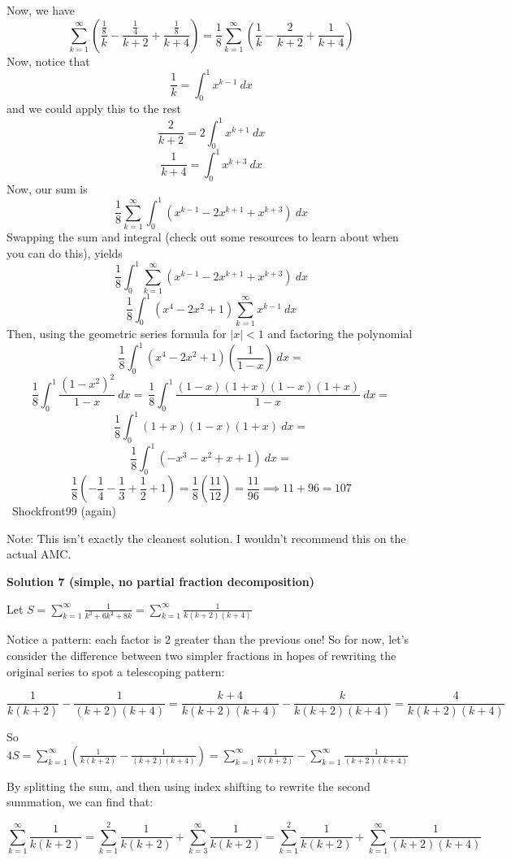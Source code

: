 \begin{enumerate}
 Now, we have 
 \[\sum_{k=1}^{\infty} \left(\frac{\frac{1}{8}}{k}-\frac{\frac{1}{4}}{k+2}+\frac{\frac{1}{8}}{k+4}\right)=\frac{1}{8}\sum_{k=1}^{\infty} \left(\frac{1}{k}-\frac{2}{k+2}+\frac{1}{k+4}\right)\]Now, notice that 
 \[\frac{1}{k}=\int_0^1x^{k-1} \ dx\]and we could apply this to the rest
 \[\frac{2}{k+2}=2\int_0^1x^{k+1} \ dx\]
 \[\frac{1}{k+4}=\int_0^1x^{k+3} \ dx\]Now, our sum is
 \[\frac{1}{8}\sum_{k=1}^\infty\int_0^1\left(x^{k-1}-2x^{k+1}+x^{k+3}\right) \ dx\]Swapping the sum and integral (check out some resources to learn about when you can do this), yields
 \[\frac{1}{8}\int_0^1\sum_{k=1}^\infty\left(x^{k-1}-2x^{k+1}+x^{k+3}\right) \ dx\]
 \[\frac{1}{8}\int_0^1 \left(x^{4}-2x^2+1\right)\sum_{k=1}^\infty x^{k-1} \ dx\]Then, using the geometric series formula for $|x|<1$ and factoring the polynomial
 \[\frac{1}{8}\int_0^1 \left(x^{4}-2x^2+1\right)\left(\frac{1}{1-x}\right) \ dx=\]
 \[\frac{1}{8}\int_0^1 \frac{(1-x^2)^2}{1-x} \ dx= \ \frac{1}{8}\int_0^1 \frac{(1-x)(1+x)(1-x)(1+x)}{1-x} \ dx=\]
 \[\frac{1}{8}\int_0^1 (1+x)(1-x)(1+x) \ dx=\]
 \[\frac{1}{8}\int_0^1 (-x^3-x^2+x+1) \ dx=\]
 \[\frac{1}{8}\left(-\frac{1}{4}-\frac{1}{3}+\frac{1}{2}+1\right)=\frac{1}{8}\left(\frac{11}{12}\right)=\frac{11}{96} \implies 11+96=\boxed{107}\]~Shockfront99 (again)

 Note: This isn't exactly the cleanest solution. I wouldn't recommend this on the actual AMC.

 



\textbf{Solution 7 (simple, no partial fraction decomposition)}

Let $S = \sum_{k=1}^{\infty} \frac{1}{k^3+6k^2+8k} = \sum_{k=1}^{\infty} \frac{1}{k(k+2)(k+4)}$

 Notice a pattern: each factor is 2 greater than the previous one! So for now, let's consider the difference between two simpler fractions in hopes of rewriting the original series to spot a telescoping pattern:

 
 \[\frac{1}{k(k+2)} - \frac{1}{(k+2)(k+4)} = \frac{k+4}{k(k+2)(k+4)} - \frac{k}{k(k+2)(k+4)} = \frac{4}{k(k+2)(k+4)}\]

 So $4S = \sum_{k=1}^{\infty} (\frac{1}{k(k+2)} - \frac{1}{(k+2)(k+4)}) = \sum_{k=1}^{\infty} \frac{1}{k(k+2)} - \sum_{k=1}^{\infty} \frac{1}{(k+2)(k+4)}$

 By splitting the sum, and then using index shifting to rewrite the second summation, we can find that:

 
 \[\sum_{k=1}^{\infty} \frac{1}{k(k+2)} = \sum_{k=1}^{2} \frac{1}{k(k+2)} + \sum_{k=3}^{\infty} \frac{1}{k(k+2)} = \sum_{k=1}^{2} \frac{1}{k(k+2)} + \sum_{k=1}^{\infty} \frac{1}{(k+2)(k+4)}\]


\end{enumerate}

